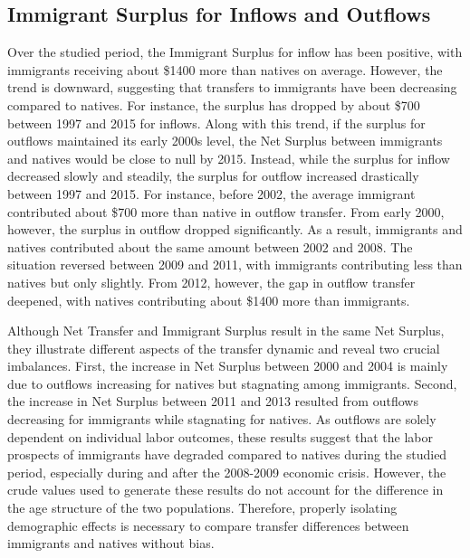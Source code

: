 \subsection{Immigrant Surplus for Inflows and Outflows}
Over the studied period, the Immigrant Surplus for inflow has been positive, with immigrants receiving about \$\num{1400} more than natives on average.
However, the trend is downward, suggesting that transfers to immigrants have been decreasing compared to natives.
For instance, the surplus has dropped by about \$\num{700} between 1997 and 2015 for inflows. Along with this trend, if the surplus for outflows maintained its early 2000s level, the Net Surplus between immigrants and natives would be close to null by 2015.
Instead, while the surplus for inflow decreased slowly and steadily, the surplus for outflow increased drastically between 1997 and 2015.
For instance, before 2002, the average immigrant contributed about \$\num{700} more than native in outflow transfer.
From early 2000, however, the surplus in outflow dropped significantly. As a result, immigrants and natives contributed about the same amount between 2002 and 2008.
The situation reversed between 2009 and 2011, with immigrants contributing less than natives but only slightly.
From 2012, however, the gap in outflow transfer deepened, with natives contributing about \$\num{1400} more than immigrants.

\vspace{0.7em}\par
Although Net Transfer and Immigrant Surplus result in the same Net Surplus, they illustrate different aspects of the transfer dynamic and reveal two crucial imbalances.
First, the increase in Net Surplus between 2000 and 2004 is mainly due to outflows increasing for natives but stagnating among immigrants.
Second, the increase in Net Surplus between 2011 and 2013 resulted from outflows decreasing for immigrants while stagnating for natives.
As outflows are solely dependent on individual labor outcomes, these results suggest that the labor prospects of immigrants have degraded compared to natives during the studied period, especially during and after the 2008-2009 economic crisis.
However, the crude values used to generate these results do not account for the difference in the age structure of the two populations.
Therefore, properly isolating demographic effects is necessary to compare transfer differences between immigrants and natives without bias.















